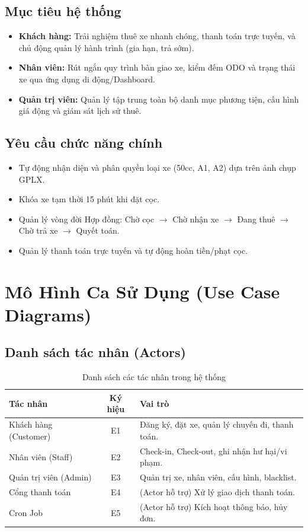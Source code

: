 \documentclass[12pt,a4paper]{report}
\begin{document}
\section{Mục tiêu hệ thống}
\begin{itemize}
    \item \textbf{Khách hàng:} Trải nghiệm thuê xe nhanh chóng, thanh toán trực tuyến, và chủ động quản lý hành trình (gia hạn, trả sớm).
    \item \textbf{Nhân viên:} Rút ngắn quy trình bàn giao xe, kiểm đếm ODO và trạng thái xe qua ứng dụng di động/Dashboard.
    \item \textbf{Quản trị viên:} Quản lý tập trung toàn bộ danh mục phương tiện, cấu hình giá động và giám sát lịch sử thuê.
\end{itemize}

\section{Yêu cầu chức năng chính}
\begin{itemize}
    \item Tự động nhận diện và phân quyền loại xe (50cc, A1, A2) dựa trên ảnh chụp GPLX.
    \item Khóa xe tạm thời 15 phút khi đặt cọc.
    \item Quản lý vòng đời Hợp đồng: Chờ cọc $\rightarrow$ Chờ nhận xe $\rightarrow$ Đang thuê $\rightarrow$ Chờ trả xe $\rightarrow$ Quyết toán.
    \item Quản lý thanh toán trực tuyến và tự động hoàn tiền/phạt cọc.
\end{itemize}


\chapter{Mô Hình Ca Sử Dụng (Use Case Diagrams)}

\section{Danh sách tác nhân (Actors)}
\begin{table}[H]
    \centering
    \begin{tabular}{|l|c|p{8cm}|}
        \hline
        \textbf{Tác nhân} & \textbf{Ký hiệu} & \textbf{Vai trò} \\
        \hline
        Khách hàng (Customer) & E1 & Đăng ký, đặt xe, quản lý chuyến đi, thanh toán. \\
        Nhân viên (Staff) & E2 & Check-in, Check-out, ghi nhận hư hại/vi phạm. \\
        Quản trị viên (Admin) & E3 & Quản trị xe, nhân viên, cấu hình, blacklist. \\
        Cổng thanh toán & E4 & (Actor hỗ trợ) Xử lý giao dịch thanh toán. \\
        Cron Job & E5 & (Actor hỗ trợ) Kích hoạt thông báo, hủy đơn. \\
        \hline
    \end{tabular}
    \caption{Danh sách các tác nhân trong hệ thống}
\end{table}
\end{document}
